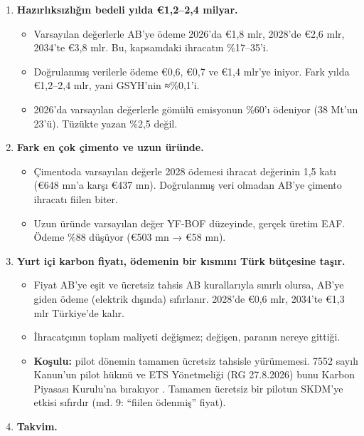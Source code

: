\begin{enumerate}
\def\labelenumi{\arabic{enumi}.}
\tightlist
\item
  \textbf{Hazırlıksızlığın bedeli yılda €1,2--2,4 milyar.}

  \begin{itemize}
  \tightlist
  \item
    Varsayılan değerlerle AB'ye ödeme 2026'da €1,8 mlr, 2028'de €2,6 mlr, 2034'te €3,8 mlr. Bu, kapsamdaki ihracatın \%17--35'i.
  \item
    Doğrulanmış verilerle ödeme €0,6, €0,7 ve €1,4 mlr'ye iniyor. Fark yılda €1,2--2,4 mlr, yani GSYH'nin ≈\%0,1'i.
  \item
    2026'da varsayılan değerlerle gömülü emisyonun \%60'ı ödeniyor (38 Mt'un 23'ü). Tüzükte yazan \%2,5 değil.
  \end{itemize}
\item
  \textbf{Fark en çok çimento ve uzun üründe.}

  \begin{itemize}
  \tightlist
  \item
    Çimentoda varsayılan değerle 2028 ödemesi ihracat değerinin 1,5 katı (€648 mn'a karşı €437 mn). Doğrulanmış veri olmadan AB'ye çimento ihracatı fiilen biter.
  \item
    Uzun üründe varsayılan değer YF-BOF düzeyinde, gerçek üretim EAF. Ödeme \%88 düşüyor (€503 mn → €58 mn).
  \end{itemize}
\item
  \textbf{Yurt içi karbon fiyatı, ödemenin bir kısmını Türk bütçesine taşır.}

  \begin{itemize}
  \tightlist
  \item
    Fiyat AB'ye eşit ve ücretsiz tahsis AB kurallarıyla sınırlı olursa, AB'ye giden ödeme (elektrik dışında) sıfırlanır. 2028'de €0,6 mlr, 2034'te €1,3 mlr Türkiye'de kalır.
  \item
    İhracatçının toplam maliyeti değişmez; değişen, paranın nereye gittiği.
  \item
    \textbf{Koşulu:} pilot dönemin tamamen ücretsiz tahsisle yürümemesi. 7552 sayılı Kanun'un pilot hükmü ve ETS Yönetmeliği (RG 27.8.2026) bunu Karbon Piyasası Kurulu'na bırakıyor \etiketV{}. Tamamen ücretsiz bir pilotun SKDM'ye etkisi sıfırdır (md. 9: ``fiilen ödenmiş'' fiyat).
  \end{itemize}
\item
  \textbf{Takvim.}


\end{enumerate}
